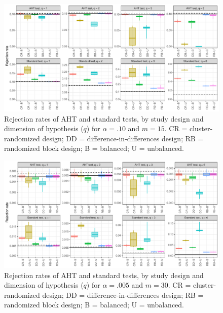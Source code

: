 \documentclass[12pt]{article}
\begin{document}
\begin{landscape}
\begin{figure}[H]
{\centering \includegraphics[width=\linewidth]{CR_fig/balance_10_15-1} 

}

\caption{Rejection rates of AHT and standard tests, by study design and dimension of hypothesis ($q$) for $\alpha = .10$ and $m = 15$. CR = cluster-randomized design; DD = difference-in-differences design; RB = randomized block design; B = balanced; U = unbalanced.}\label{fig:balance_10_15}
\end{figure}

\begin{figure}[H]

{\centering \includegraphics[width=\linewidth]{CR_fig/balance_005_30-1} 

}

\caption{Rejection rates of AHT and standard tests, by study design and dimension of hypothesis ($q$) for $\alpha = .005$ and $m = 30$. CR = cluster-randomized design; DD = difference-in-differences design; RB = randomized block design; B = balanced; U = unbalanced.}\label{fig:balance_005_30}
\end{figure}

\begin{figure}[H]


\end{figure}
\end{landscape}
\end{document}
